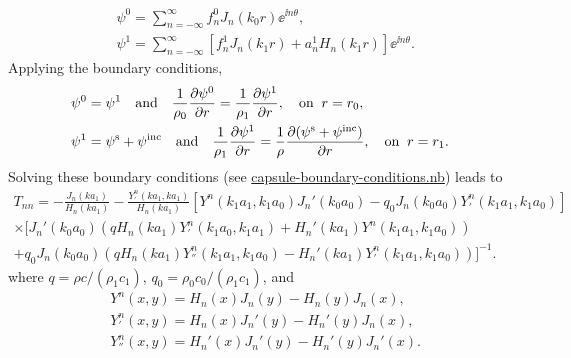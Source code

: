 \documentclass[ 12pt, a4paper]{article}
\begin{document}
\begin{figure}[t]
\centering

  \label{fig:capsule}
\end{figure}

\begin{align}
  & \psi^0 = \sum_{n=-\infty}^\infty f_n^0 J_{n}(k_0 r) \ee^{\ii n \theta},
  \\
  & \psi^1 = \sum_{n=-\infty}^\infty \left [ f_n^1 J_{n}(k_1 r) + a_n^1 H_{n}(k_1 r) \right ] \ee^{\ii n \theta}.
\end{align}
Applying the boundary conditions,
\begin{align}
  	& \psi^0 = \psi^1 \quad \text{and} \quad \frac{1}{\rho_0} \frac{\partial \psi^0}{\partial r} = \frac{1}{\rho_1} \frac{\partial \psi^1}{\partial r}, \quad \text{on} \;\; r = r_0,
    \label{eqn:inner_bc}
    \\
  	& \psi^1 = \psi^{\mathrm{s}} + \psi^{\mathrm{inc}} \quad \text{and} \quad \frac{1}{\rho_1} \frac{\partial \psi^1}{\partial r} = \frac{1}{\rho} \frac{\partial (\psi^{\mathrm{s}} + \psi^{\mathrm{inc}})}{\partial r}, \quad \text{on} \;\; r = r_1.
    \label{eqn:outer_bc}
\end{align}
Solving these boundary conditions (see \href{capsule-boundary-conditions.nb}{capsule-boundary-conditions.nb}) leads to
\begin{multline}
  T_{nn} = - \frac{J_n(k a_1)}{H_n(k a_1)} - \frac{Y^n_{'}(k a_1, k a_1)}{H_n(ka_1)} \left[Y^n(k_1 a_1,k_1 a_0) J_n'(k_0 a_0) - q_0 J_n(k_0 a_0) Y^n_{'}(k_1 a_1,k_1 a_0) \right]
  \\ \times \big[
    J_n'(k_0 a_0)(q H_n(k a_1)Y^n_{'}(k_1 a_0,k_1 a_1) + H_n'(k a_1) Y^n(k_1 a_1,k_1 a_0))
    \\
    + q_0 J_n(k_0 a_0)(q H_n(k a_1)Y^n_{''}(k_1 a_1,k_1 a_0) - H_n'(k a_1) Y^n_{'}(k_1 a_1, k_1 a_0))
  \big]^{-1}.
\end{multline}
where $q = \rho c/(\rho_1 c_1)$, $q_0 = \rho_0 c_0/( \rho_1 c_1)$, and
\begin{align}
  & Y^n(x,y) = H_n(x) J_n(y) - H_n(y) J_n(x), \\
  & Y^n_{'}(x,y) = H_n(x) J_n'(y) - H_n'(y) J_n(x), \\
  & Y^n_{''}(x,y) = H_n'(x) J_n'(y) - H_n'(y) J_n'(x).
\end{align}
\end{document}
